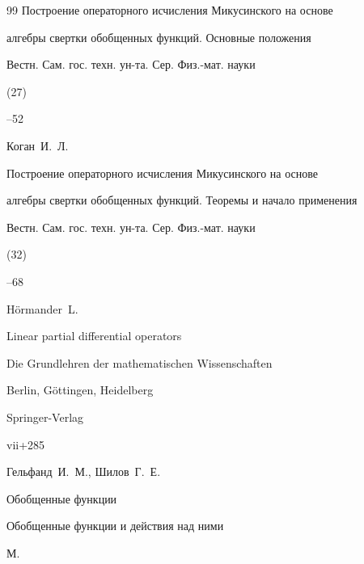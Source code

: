 \begin{thebibliography}{99}
\paper Построение операторного исчисления Микусинского на основе 

алгебры свертки обобщенных функций. Основные положения 

\jour  Вестн. Сам. гос. техн. ун-та. Сер. Физ.-мат. науки


(27)

--52






\by Коган~И.~Л.

\paper Построение операторного исчисления Микусинского на основе 

алгебры свертки обобщенных функций. Теоремы и начало применения

\jour  Вестн. Сам. гос. техн. ун-та. Сер. Физ.-мат. науки


(32) 

--68








\by H\"{o}rmander~L.

\book Linear partial differential operators

\serial Die Grundlehren der mathematischen Wissenschaften


\publaddr Berlin,  G\"{o}ttingen, Heidelberg

\publ Springer-Verlag

\totalpages vii+285 






\by Гельфанд~И.~М., Шилов~Г.~Е.

\book Обобщенные функции


\volinfo Обобщенные функции и действия над ними

\publaddr М.


\end{thebibliography}
